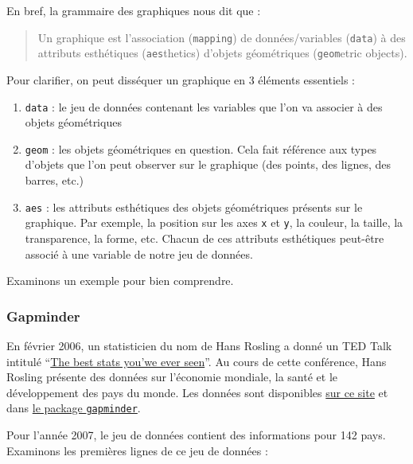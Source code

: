 \documentclass[
  a4paper,
]{article}
\providecommand{\tightlist}{%
  \setlength{\itemsep}{0pt}\setlength{\parskip}{0pt}}
\begin{document}
En bref, la grammaire des graphiques nous dit que :

\begin{quote}
Un graphique est l'association (\texttt{mapping}) de données/variables (\texttt{data}) à des attributs esthétiques (\texttt{aes}thetics) d'objets géométriques (\texttt{geom}etric objects).
\end{quote}

Pour clarifier, on peut disséquer un graphique en 3 éléments essentiels :

\begin{enumerate}
\def\labelenumi{\arabic{enumi}.}
\tightlist
\item
  \texttt{data} : le jeu de données contenant les variables que l'on va associer à des objets géométriques
\item
  \texttt{geom} : les objets géométriques en question. Cela fait référence aux types d'objets que l'on peut observer sur le graphique (des points, des lignes, des barres, etc.)
\item
  \texttt{aes} : les attributs esthétiques des objets géométriques présents sur le graphique. Par exemple, la position sur les axes \texttt{x} et \texttt{y}, la couleur, la taille, la transparence, la forme, etc. Chacun de ces attributs esthétiques peut-être associé à une variable de notre jeu de données.
\end{enumerate}

Examinons un exemple pour bien comprendre.

\hypertarget{gapminder}{%
\subsubsection{Gapminder}\label{gapminder}}

En février 2006, un statisticien du nom de Hans Rosling a donné un TED Talk intitulé ``\href{https://www.ted.com/talks/hans_rosling_shows_the_best_stats_you_ve_ever_seen}{The best stats you'we ever seen}''. Au cours de cette conférence, Hans Rosling présente des données sur l'économie mondiale, la santé et le développement des pays du monde. Les données sont disponibles \href{https://www.gapminder.org/tools/\#$chart-type=bubbles}{sur ce site} et dans \href{https://cran.r-project.org/web/packages/gapminder/index.html}{le package \texttt{gapminder}}.

Pour l'année 2007, le jeu de données contient des informations pour 142 pays. Examinons les premières lignes de ce jeu de données :
\end{document}
